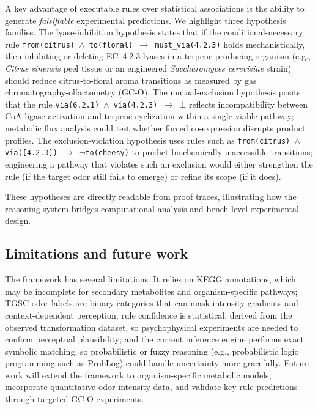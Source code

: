 \documentclass[a4paper,fleqn]{cas-sc}
\begin{document}
A key advantage of executable rules over statistical associations is the ability to generate \emph{falsifiable} experimental predictions. We highlight three hypothesis families. The lyase-inhibition hypothesis states that if the conditional-necessary rule \texttt{from(citrus) $\wedge$ to(floral) $\rightarrow$ must\_via(4.2.3)} holds mechanistically, then inhibiting or deleting EC~4.2.3 lyases in a terpene-producing organism (e.g., \emph{Citrus sinensis} peel tissue or an engineered \emph{Saccharomyces cerevisiae} strain) should reduce citrus-to-floral aroma transitions as measured by gas chromatography-olfactometry (GC-O). The mutual-exclusion hypothesis posits that the rule \texttt{via(6.2.1) $\wedge$ via(4.2.3) $\rightarrow$ $\bot$} reflects incompatibility between CoA-ligase activation and terpene cyclization within a single viable pathway; metabolic flux analysis could test whether forced co-expression disrupts product profiles. The exclusion-violation hypothesis uses rules such as \texttt{from(citrus) $\wedge$ via([4.2.3]) $\rightarrow$ $\neg$to(cheesy)} to predict biochemically inaccessible transitions; engineering a pathway that violates such an exclusion would either strengthen the rule (if the target odor still fails to emerge) or refine its scope (if it does).

These hypotheses are directly readable from proof traces, illustrating how the reasoning system bridges computational analysis and bench-level experimental design.

\subsection{Limitations and future work}

The framework has several limitations. It relies on KEGG annotations, which may be incomplete for secondary metabolites and organism-specific pathways; TGSC odor labels are binary categories that can mask intensity gradients and context-dependent perception; rule confidence is statistical, derived from the observed transformation dataset, so psychophysical experiments are needed to confirm perceptual plausibility; and the current inference engine performs exact symbolic matching, so probabilistic or fuzzy reasoning (e.g., probabilistic logic programming such as ProbLog) could handle uncertainty more gracefully. Future work will extend the framework to organism-specific metabolic models, incorporate quantitative odor intensity data, and validate key rule predictions through targeted GC-O experiments.
\end{document}
